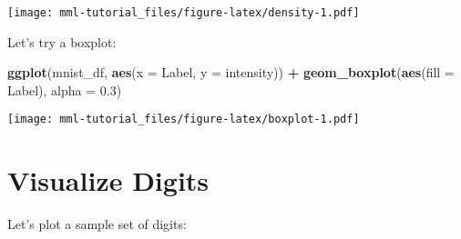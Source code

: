 \documentclass[]{book}
\newenvironment{Shaded}{\begin{snugshade}}{\end{snugshade}}
\newcommand{\KeywordTok}[1]{\textcolor[rgb]{0.13,0.29,0.53}{\textbf{#1}}}
\newcommand{\DataTypeTok}[1]{\textcolor[rgb]{0.13,0.29,0.53}{#1}}
\newcommand{\DecValTok}[1]{\textcolor[rgb]{0.00,0.00,0.81}{#1}}
\newcommand{\FloatTok}[1]{\textcolor[rgb]{0.00,0.00,0.81}{#1}}
\newcommand{\StringTok}[1]{\textcolor[rgb]{0.31,0.60,0.02}{#1}}
\newcommand{\ControlFlowTok}[1]{\textcolor[rgb]{0.13,0.29,0.53}{\textbf{#1}}}
\newcommand{\OperatorTok}[1]{\textcolor[rgb]{0.81,0.36,0.00}{\textbf{#1}}}
\newcommand{\NormalTok}[1]{#1}
\theoremstyle{definition}
\theoremstyle{definition}
\theoremstyle{definition}
\theoremstyle{remark}
\begin{document}
\texttt{[image: mml-tutorial\_files/figure-latex/density-1.pdf]}

Let's try a boxplot:

\begin{Shaded}
\begin{Highlighting}[]
\KeywordTok{ggplot}\NormalTok{(mnist_df, }\KeywordTok{aes}\NormalTok{(}\DataTypeTok{x =}\NormalTok{ Label, }\DataTypeTok{y =}\NormalTok{ intensity)) }\OperatorTok{+}
\StringTok{  }\KeywordTok{geom_boxplot}\NormalTok{(}\KeywordTok{aes}\NormalTok{(}\DataTypeTok{fill =}\NormalTok{ Label), }\DataTypeTok{alpha =} \FloatTok{0.3}\NormalTok{)}
\end{Highlighting}
\end{Shaded}

\texttt{[image: mml-tutorial\_files/figure-latex/boxplot-1.pdf]}

\section{Visualize Digits}\label{visualize-digits}

Let's plot a sample set of digits:

\begin{Shaded}
\end{Shaded}
\end{document}
